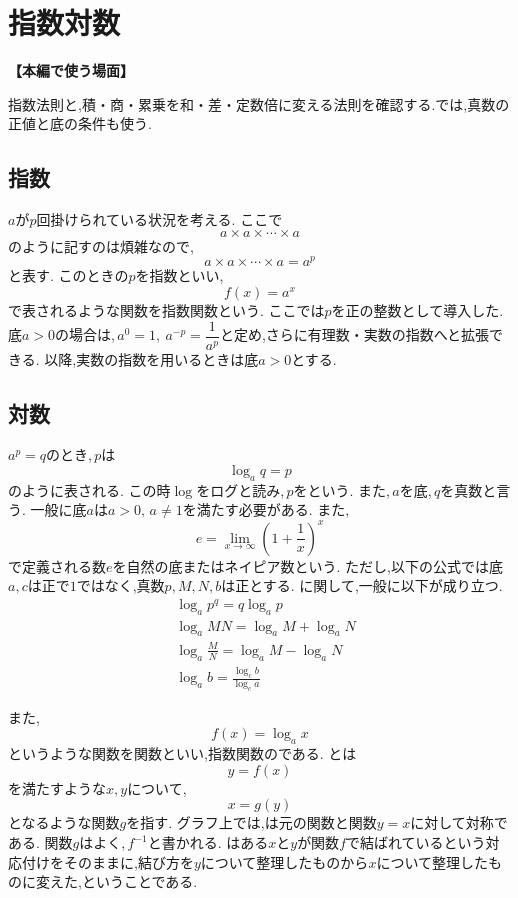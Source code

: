 
  \section{指数対数}\label{節：指数対数}
  \noindent\textbf{【本編で使う場面】}\par
  指数法則と,積・商・累乗を和・差・定数倍に変える法則を確認する.では,真数の正値と底の条件も使う.

    \subsection{指数}\label{節：指数}
      $a$が$p$回掛けられている状況を考える.
      ここで
      \[
        a\times a\times\cdots\times a
      \]
      のように記すのは煩雑なので,
      \[
        a\times a\times\cdots\times a=a^p
      \]
      と表す.
      このときの$p$を指数といい,
      \[
        f(x)=a^x
      \]
      で表されるような関数を指数関数という.
      ここでは$p$を正の整数として導入した.底$a>0$の場合は,\,$a^0=1,\ a^{-p}=\dfrac1{a^p}$と定め,さらに有理数・実数の指数へと拡張できる.
      以降,実数の指数を用いるときは底$a>0$とする.
    \subsection{対数}\label{節：対数}
      $a^p=q$のとき,\,$p$は
      \[
        \log_a{q}=p
      \]
      のように表される.
      この時$\log$をログと読み,\,$p$をという.
      また,\,$a$を底,\,$q$を真数と言う.
      一般に底$a$は$a>0,\,a\ne1$を満たす必要がある.
      また,
      \[
        e=\lim_{x \to \infty} \left(1+\frac{1}{x}\right)^x
      \]
      で定義される数$e$を自然の底またはネイピア数という.
      ただし,以下の公式では底$a,c$は正で$1$ではなく,真数$p,M,N,b$は正とする.
      に関して,一般に以下が成り立つ.
      \begin{align*}
        &\log_a{p^q}=q\log_a{p}\\
        &\log_a{MN}=\log_a{M}+\log_a{N}\\
        &\log_a{\frac{M}{N}}=\log_a{M}-\log_a{N}\\
        &\log_a{b}=\frac{\log_c{b}}{\log_c{a}}
      \end{align*}

      また,
      \[
        f(x)=\log_a x
      \]
      というような関数を関数といい,指数関数のである.
      とは
      \[
        y=f(x)
      \]
      を満たすような$x,y$について,
      \[
        x=g(y)
      \]
      となるような関数$g$を指す.
      グラフ上では,は元の関数と関数$y=x$に対して対称である.
      関数$g$はよく,\,$f^{-1}$と書かれる.
      はある$x$と$y$が関数$f$で結ばれているという対応付けをそのままに,結び方を$y$について整理したものから$x$について整理したものに変えた,ということである.
